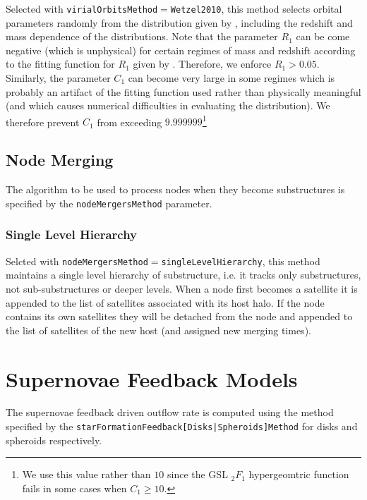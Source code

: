 Selected with {\tt virialOrbitsMethod}$=${\tt Wetzel2010}, this method selects orbital parameters randomly from the distribution given by \cite{wetzel_orbits_2010}, including the redshift and mass dependence of the distributions. Note that the parameter $R_1$ can be come negative (which is unphysical) for certain regimes of mass and redshift according to the fitting function for $R_1$ given by \cite{wetzel_orbits_2010}. Therefore, we enforce $R_1>0.05$. Similarly, the parameter $C_1$ can become very large in some regimes which is probably an artifact of the fitting function used rather than physically meaningful (and which causes numerical difficulties in evaluating the distribution). We therefore prevent $C_1$ from exceeding $9.999999$\footnote{We use this value rather than $10$ since the GSL $_2F_1$ hypergeomtric function fails in some cases when $C_1\ge 10$.}

\subsection{Node Merging}

The algorithm to be used to process nodes when they become substructures is specified by the {\tt nodeMergersMethod} parameter.

\subsubsection{Single Level Hierarchy}

Selcted with {\tt nodeMergersMethod}$=${\tt singleLevelHierarchy}, this method maintains a single level hierarchy of substructure, i.e. it tracks only substructures, not sub-substructures or deeper levels. When a \gls{node} first becomes a satellite it is appended to the list of satellites associated with its host halo. If the \gls{node} contains its own satellites they will be detached from the \gls{node} and appended to the list of satellites of the new host (and assigned new merging times).

\section{Supernovae Feedback Models}\label{sec:sneFeedback}

The supernovae feedback driven outflow rate is computed using the method specified by the {\tt starFormationFeedback[Disks|Spheroids]Method} for disks and spheroids respectively.

